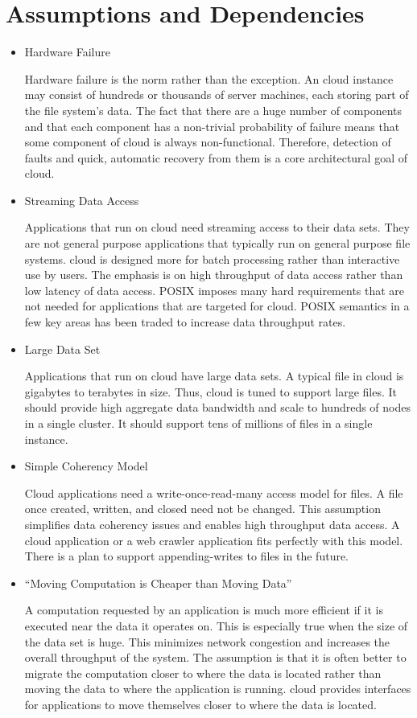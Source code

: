 \documentclass[oneside,a4paper,12pt]{book}
\begin{document}
\section{Assumptions and Dependencies}
\begin{itemize}
    \item Hardware Failure
  \par Hardware failure is the norm rather than the exception. An cloud instance may consist of hundreds or thousands of server machines, each storing part of the file system’s data. The fact that there are a huge number of components and that each component has a non-trivial probability of failure means that some component of cloud is always non-functional. Therefore, detection of faults and quick, automatic recovery from them is a core architectural goal of cloud.
  \item Streaming Data Access
  \par Applications that run on cloud need streaming access to their data sets. They are not general purpose applications that typically run on general purpose file systems. cloud is designed more for batch processing rather than interactive use by users. The emphasis is on high throughput of data access rather than low latency of data access. POSIX imposes many hard requirements that are not needed for applications that are targeted for cloud. POSIX semantics in a few key areas has been traded to increase data throughput rates.
  \item Large Data Set
  \par Applications that run on cloud have large data sets. A typical file in cloud is gigabytes to terabytes in size. Thus, cloud is tuned to support large files. It should provide high aggregate data bandwidth and scale to hundreds of nodes in a single cluster. It should support tens of millions of files in a single instance.
  \item Simple Coherency Model
  \par 
  Cloud applications need a write-once-read-many access model for files. A file once created, written, and closed need not be changed. This assumption simplifies data coherency issues and enables high throughput data access. A cloud application or a web crawler application fits perfectly with this model. There is a plan to support appending-writes to files in the future.
  \item “Moving Computation is Cheaper than Moving Data”
  \par A computation requested by an application is much more efficient if it is executed near the data it operates on. This is especially true when the size of the data set is huge. This minimizes network congestion and increases the overall throughput of the system. The assumption is that it is often better to migrate the computation closer to where the data is located rather than moving the data to where the application is running. cloud provides interfaces for applications to move themselves closer to where the data is located.

\end{itemize}
\end{document}
